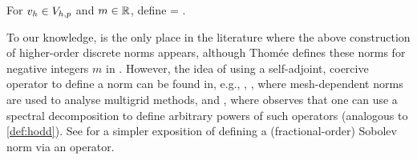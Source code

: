 For $v_{h} \in V_{h,p}$ and $m \in \mathbb R$, define
\beqs
\Nmhn{\vh} = .
\eeqs
\ede






To our knowledge, \cite{DuWu:15} is the only place in the literature where the above construction of higher-order discrete norms appears, although Thom\'{e}e defines these norms for negative integers $m$ in \cite[Equation above Lemma 1]{Th:80}. However, the idea of using a self-adjoint, coercive operator to define a norm can be found in, e.g., \cite[Section 6.2]{BrSc:08}, \cite[p. 238 ff.]{Br:07}, where mesh-dependent norms are used to analyse multigrid methods, and \cite[Section 2.1]{LiMa:72}, where \cite[Text at the bottom of page 9]{LiMa:72} observes that one can use a spectral decomposition to define arbitrary powers of such operators (analogous to \cref{def:hodd}). See \cite[Section 2.1]{BaKuMa:19} for a simpler exposition of defining a (fractional-order) Sobolev norm via an operator.

